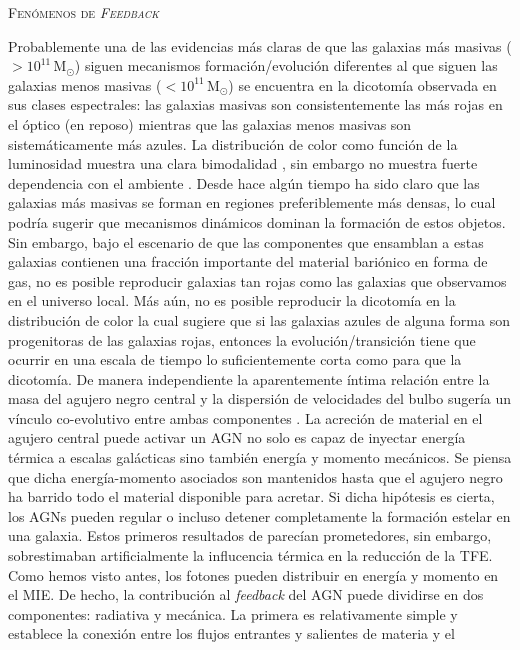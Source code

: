 \documentclass[xcolor=dvipsnames,4pt,hyperref={colorlinks,citecolor=black,linkcolor=black,urlcolor=black}]{beamer}
\begin{document}
\begin{frame}[allowframebreaks]{\textsc{Fenómenos de \emph{Feedback}}}
\begin{description}
Probablemente una de las evidencias más claras de que las galaxias más masivas
($>10^{11}\,$M$_\odot$) siguen mecanismos formación/evolución diferentes al que siguen las galaxias
menos masivas ($<10^{11}\,$M$_\odot$) se encuentra en la dicotomía observada en sus clases
espectrales: las galaxias masivas son consistentemente las más rojas en el óptico (en reposo)
mientras que las galaxias menos masivas son sistemáticamente más azules. La distribución de color
como función de la luminosidad muestra una clara bimodalidad \citep{Strateva2001, Baldry2004,
Balogh2004}, sin embargo no muestra fuerte dependencia con el ambiente \citep[medido usando la
densidad local, e.\,g.,][]{Balogh2004}. Desde hace algún tiempo ha sido claro que las galaxias más
masivas se forman en regiones preferiblemente más densas, lo cual podría sugerir que mecanismos
dinámicos dominan la formación de estos objetos. Sin embargo, bajo el escenario de que las
componentes que ensamblan a estas galaxias contienen una fracción importante del material bariónico
en forma de gas, no es posible reproducir galaxias tan rojas como las galaxias que observamos en el
universo local. Más aún, no es posible reproducir la dicotomía en la distribución de color la cual
sugiere que si las galaxias azules de alguna forma son progenitoras de las galaxias rojas, entonces
la evolución/transición tiene que ocurrir en una escala de tiempo lo suficientemente corta como para
que la dicotomía.
De manera independiente la aparentemente íntima relación entre la masa del agujero negro central y
la dispersión de velocidades del bulbo sugería un vínculo co-evolutivo entre ambas componentes
\citep{Ferrarese2000, Tremaine2002}. La acreción de material en el agujero central puede activar un
AGN no solo es capaz de inyectar energía térmica a escalas galácticas sino también energía y momento
mecánicos. Se piensa que dicha energía-momento asociados son mantenidos hasta que el agujero negro
ha barrido todo el material disponible para acretar. Si dicha hipótesis es cierta, los AGNs pueden
regular o incluso detener completamente la formación estelar en una galaxia.
Estos primeros resultados de \citet{Springel2005a} parecían prometedores, sin embargo, sobrestimaban
artificialmente la influcencia térmica en la reducción de la TFE. Como hemos visto antes, los
fotones pueden distribuir en energía y momento en el MIE. De hecho, la contribución al
\emph{feedback} del AGN puede dividirse en dos componentes: radiativa y mecánica. La primera es
relativamente simple y establece la conexión entre los flujos entrantes y salientes de materia y el

\end{description}
\end{frame}
\end{document}
